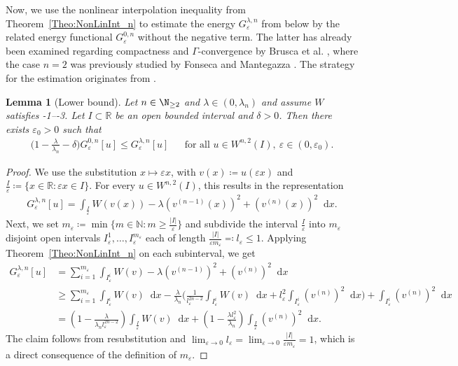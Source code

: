 \documentclass{article}
\newcommand{\dd}{\mathop{}\mathrm{d}} %
\newcommand{\lam}{\lambda}
\newcommand{\eps}{\varepsilon}
\numberwithin{figure}{section}
\newcommand{\R}{\mathbb{R}}
\newtheorem{lemma}[theorem]{Lemma}
\numberwithin{equation}{section}
\begin{document}
Now, we use the nonlinear interpolation inequality from Theorem~\ref{Theo:NonLinInt_n} to estimate the energy $G_\eps^{\lam,n}$ from below by the related energy functional $G_\eps^{0,n}$ without the negative term. The latter has already been examined regarding compactness and $\Gamma$-convergence by Brusca et al. \cite{BruDonSol}, where the case $n=2$ was previously studied by Fonseca and Mantegazza \cite{FonMan}. The strategy for the estimation originates from \cite[Proposition~3.3]{CicSpaZep}.
 
 \begin{lemma}[Lower bound] \label{abschCic_n}
Let $n \in \N_{\geq2}$ and $\lam \in (0,\lam_n)$ and assume $W$ satisfies \hyp1--\hyp3. Let $I \subset \R$ be an open bounded interval and $\delta > 0$. Then there exists $\eps_0 > 0$ such that
    \begin{align} \label{eq:abschCic_n}
        \Big( 1 - \frac{\lam}{\lam_n} - \delta \Big) G_\eps^{0,n}[u] \leq G_\eps^{\lam,n}[u]   && \text{for all } u \in W^{n,2}(I), \ \eps \in (0, \eps_0).
    \end{align}
 \end{lemma}

 \begin{proof}
     We use the substitution $x \mapsto \eps x$, with $v(x) \coloneq  u(\eps x)$ and $\frac{I}{\eps} \coloneq \{x \in \mathbb{R}: \eps x \in I\}$. For every $u \in W^{n,2}(I)$, this results in the representation
    \begin{align}
        G^{\lam,n}_\eps[u]
        = \int_{\frac{I}{\eps}} W(v(x)) - \lam (v^{(n-1)}(x))^2 + (v^{(n)}(x))^2\dd x.
    \end{align}
     Next, we set $m_\eps \coloneq  \min\{m \in \mathbb{N}: m \geq \frac{|I|}{\eps}\}$ and subdivide the interval $\frac{I}{\eps}$ into $m_\eps$ disjoint open intervals $I_\eps^1, \ldots, I_\eps^{m_\eps}$ each of length $\frac{|I|}{\eps m_\eps} \eqcolon  l_\eps \leq 1$. Applying Theorem~\ref{Theo:NonLinInt_n} on each subinterval, we get
    \setlength\jot{0.5cm}
     \begin{align}
         G_\eps^{\lam,n}[u] & = \sum_{i=1}^{m_\eps} \int_{I_\eps^i}W(v) - \lam (v^{(n-1)})^2 + (v^{(n)})^2\dd x \\
         & \geq \sum_{i=1}^{m_\eps}  \int_{I_\eps^i} \! W(v)\dd x - \frac {\lam}{\lam_n}\bigg( \frac 1{l_\eps^{2n-2}}   \int_{I_\eps^i} \! W(v)\dd x + l_\eps^2  \int_{I_\eps^i}  (v^{(n)})^2 \dd x  \bigg) + \int_{I_\eps^i}  (v^{(n)})^2 \dd x \\
         & = \left(1-\frac{\lam}{\lam_n l_\eps^{2n-2}}\right) \int_{\frac{I}{\eps}} W(v)\dd x + \left(1-\frac{\lam l_\eps^2}{\lam_n}\right) \int_{\frac{I}{\eps}} (v^{(n)})^2\dd x.
    \end{align}
     The claim follows from resubstitution and $\lim_{\eps \to 0} l_\eps=\lim_{\eps \to 0} \frac{|I|}{\eps m_\eps} =1$, which is a direct consequence of the definition of $m_\eps$.
 \end{proof}
\end{document}
